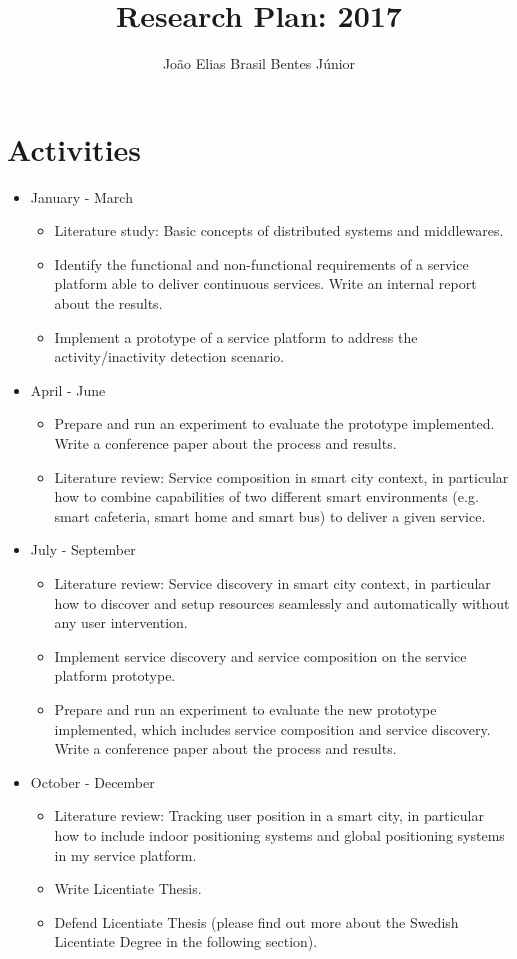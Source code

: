 \documentclass[]{article}
\title{Research Plan: 2017}
\author{Jo\~{a}o Elias Brasil Bentes J\'{u}nior}
\begin{document}
\maketitle

\section*{Activities}

\begin{itemize}
	\item January - March
		\begin{itemize}		
			\item Literature study: Basic concepts of distributed systems and middlewares.
			\item Identify the functional and non-functional requirements of a service platform able to deliver continuous services. Write an internal report about the results.
			\item Implement a prototype of a service platform to address the activity/inactivity detection scenario. 
		\end{itemize}
	\item April - June
		\begin{itemize}		
			\item Prepare and run an experiment to evaluate the prototype implemented. Write a conference paper about the process and results.
			\item Literature review: Service composition in smart city context, in particular how to combine capabilities of two different smart environments (e.g. smart cafeteria, smart home and smart bus)  to deliver a given service.
		\end{itemize}
	\item July - September
		\begin{itemize}		
			\item Literature review: Service discovery in smart city context, in particular how to discover and setup resources seamlessly and automatically without any user intervention.
			\item Implement service discovery and service composition on the service platform prototype.
			\item Prepare and run an experiment to evaluate the new prototype implemented, which includes service composition and service discovery. Write a conference paper about the process and results.
		\end{itemize}
	\item October - December
		\begin{itemize}		
			\item Literature review: Tracking user position in a smart city, in particular how to include indoor positioning systems and global positioning systems in my service platform.
			\item Write Licentiate Thesis.
			\item Defend Licentiate Thesis (please find out more about the Swedish Licentiate Degree in the following section).
		\end{itemize}
\end{itemize}
\end{document}
